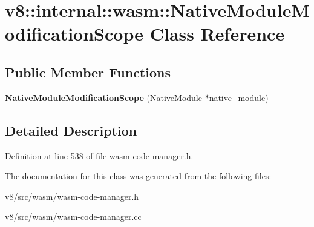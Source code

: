 \hypertarget{classv8_1_1internal_1_1wasm_1_1NativeModuleModificationScope}{}\section{v8\+:\+:internal\+:\+:wasm\+:\+:Native\+Module\+Modification\+Scope Class Reference}
\label{classv8_1_1internal_1_1wasm_1_1NativeModuleModificationScope}
\subsection*{Public Member Functions}
\begin{DoxyCompactItemize}
\item 
\mbox{\label{classv8_1_1internal_1_1wasm_1_1NativeModuleModificationScope_a25339dbd585b26cae4a4f32d3d89dfc7}} 
{\bfseries Native\+Module\+Modification\+Scope} (\mbox{\hyperlink{classv8_1_1internal_1_1wasm_1_1NativeModule}{Native\+Module}} $\ast$native\+\_\+module)
\end{DoxyCompactItemize}


\subsection{Detailed Description}


Definition at line 538 of file wasm-\/code-\/manager.\+h.



The documentation for this class was generated from the following files\+:\begin{DoxyCompactItemize}
\item 
v8/src/wasm/wasm-\/code-\/manager.\+h\item 
v8/src/wasm/wasm-\/code-\/manager.\+cc\end{DoxyCompactItemize}
